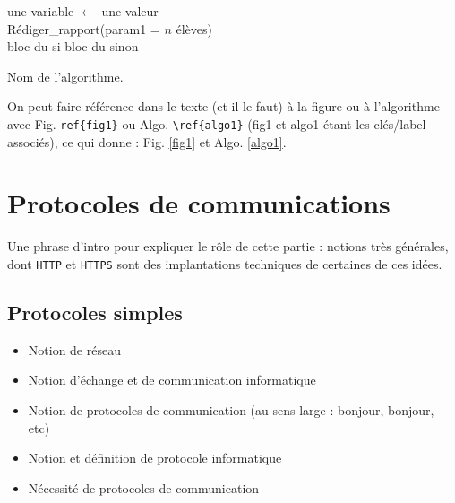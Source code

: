 \documentclass[a4paper,11pt]{article}
\begin{document}
\begin{center}
\begin{algorithm}[h!]
%
\BlankLine
{}
une variable $\leftarrow$ une valeur\\ %
Rédiger\_rapport(param1 = $n$ élèves)\\ %
  {bloc du si}
  {bloc du sinon}
\caption{Nom de l'algorithme.}
\label{algo1}
\end{algorithm}
\end{center}

On peut faire référence dans le texte (et il le faut) à la figure ou à l'algorithme avec Fig. \verb!ref{fig1}! ou Algo. \verb!\ref{algo1}! (fig1 et algo1 étant les clés/label associés), ce qui donne : Fig. \ref{fig1} et Algo. \ref{algo1}.

\section{Protocoles de communications}

Une phrase d'intro pour expliquer le rôle de cette partie : notions très générales, dont {\tt HTTP} et {\tt HTTPS} sont des implantations techniques de certaines de ces idées.

\subsection{Protocoles simples}

\begin{itemize}
\item Notion de réseau
\item Notion d'échange et de communication informatique
\item Notion de protocoles de communication (au sens large : \og bonjour\fg, \og bonjour\fg, etc)
\item Notion et définition de protocole informatique
\item Nécessité de protocoles de communication
\end{itemize}
\end{document}
